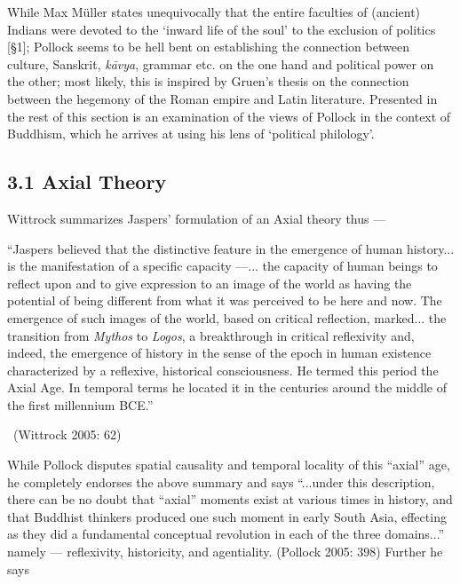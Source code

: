 While Max Müller states unequivocally that the entire faculties of (ancient) Indians were devoted to the ‘inward life of the soul’ to the exclusion of politics [§1]; Pollock seems to be hell bent on establishing the connection between culture, Sanskrit, \textit{kāvya}, grammar etc. on the one hand and political power on the other; most likely, this is inspired by Gruen’s thesis on the connection between the hegemony of the Roman empire and Latin literature. Presented in the rest of this section is an examination of the views of Pollock in the context of Buddhism, which he arrives at using his lens of ‘political philology’.

\newpage

\subsection*{3.1 Axial Theory}

Wittrock summarizes Jaspers’ formulation of an Axial theory thus —

\begin{myquote}
“Jaspers believed that the distinctive feature in the emergence of human history... is the manifestation of a specific capacity —... the capacity of human beings to reflect upon and to give expression to an image of the world as having the potential of being different from what it was perceived to be here and now. The emergence of such images of the world, based on critical reflection, marked... the transition from \textit{Mythos} to \textit{Logos}, a breakthrough in critical reflexivity and, indeed, the emergence of history in the sense of the epoch in human existence characterized by a reflexive, historical consciousness. He termed this period the Axial Age. In temporal terms he located it in the centuries around the middle of the first millennium BCE.” 

~\hfill (Wittrock 2005: 62)
\end{myquote}

While Pollock disputes spatial causality and temporal locality of this “axial” age, he completely endorses the above summary and says “...under this description, there can be no doubt that “axial” moments exist at various times in history, and that Buddhist thinkers produced one such moment in early South Asia, effecting as they did a fundamental conceptual revolution in each of the three domains...” namely — reflexivity, historicity, and agentiality. (Pollock 2005: 398) Further he says

